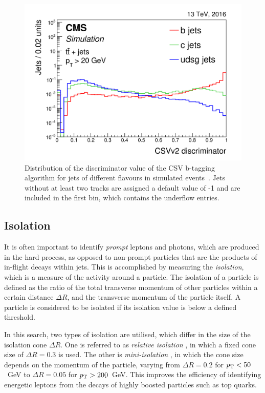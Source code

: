 \begin{figure}
\begin{center}
\includegraphics[width=0.8\linewidth]{figs/detector/btagcsv}
\end{center}
\caption{Distribution of the discriminator value of the CSV b-tagging algorithm 
for jets of different flavours in simulated \ttbar events~\cite{btagging}. Jets 
without at least two tracks are assigned a default value of -1 and are included 
in the first bin, which contains the underflow entries.}
\label{fig:btagcsv}
\end{figure}

\subsection{Isolation}%
\label{sec:detector-isolation}
It is often important to identify \textit{prompt} leptons and photons, which 
are produced in the hard process, %
as opposed to non-prompt 
particles that are the products of in-flight decays within jets. 
This is 
accomplished by measuring the \textit{isolation}, which is a measure of the 
activity around a particle. The isolation of a particle is defined as the ratio 
of the total transverse momentum of other particles within a certain distance 
$\Delta R$, and the transverse momentum of the particle itself. A particle is 
considered to be isolated if its isolation value is below a defined threshold.

In this search, two types of isolation are utilised, which differ in the size 
of the isolation cone $\Delta R$. One is referred to as \textit{relative 
isolation} \reliso, in which a fixed cone size of $\Delta R = 0.3$ is used. The 
other is \textit{mini-isolation} \miniiso, in which the cone size depends on 
the momentum of the particle, varying from $\Delta R = 0.2$ for ${p_{\text T}} < 50$~GeV 
to $\Delta R = 0.05$ for ${p_{\text T}} > 200$~GeV. This improves the efficiency of 
identifying energetic leptons from the decays of highly boosted particles such 
as top quarks. 

